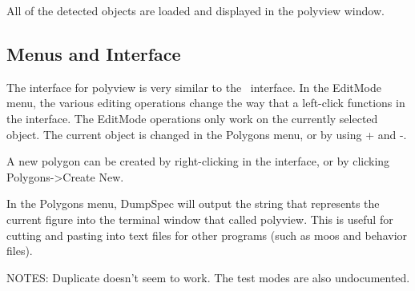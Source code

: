 All of the detected objects are loaded and displayed in the polyview window.

\subsection{Menus and Interface}
The interface for polyview is very similar to the \pmv\ interface.  In the EditMode menu, the various editing operations change the way that a left-click functions in the interface.  The EditMode operations only work on the currently selected object.  The current object is changed in the Polygons menu, or by using + and -.

A new polygon can be created by right-clicking in the interface, or by clicking Polygons-\textgreater Create New.

In the Polygons menu, DumpSpec will output the string that represents the current figure into the terminal window that called polyview.  This is useful for cutting and pasting into text files for other programs (such as moos and behavior files).

NOTES:  Duplicate doesn't seem to work.  The test modes are also undocumented.
